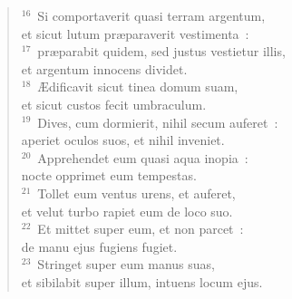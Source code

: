 \begin{flushleft}
\begin{verse}
${}^{16}$~Si comportaverit quasi terram argentum,\\ et sicut lutum pr\ae paraverit vestimenta~:\\
${}^{17}$~pr\ae parabit quidem, sed justus vestietur illis,\\ et argentum innocens dividet.\\
${}^{18}$~\AE dificavit sicut tinea domum suam,\\ et sicut custos fecit umbraculum.\\
${}^{19}$~Dives, cum dormierit, nihil secum auferet~:\\ aperiet oculos suos, et nihil inveniet.\\
${}^{20}$~Apprehendet eum quasi aqua inopia~:\\ nocte opprimet eum tempestas.\\
${}^{21}$~Tollet eum ventus urens, et auferet,\\ et velut turbo rapiet eum de loco suo.\\
${}^{22}$~Et mittet super eum, et non parcet~:\\ de manu ejus fugiens fugiet.\\
${}^{23}$~Stringet super eum manus suas,\\ et sibilabit super illum, intuens locum ejus.\end{verse}\end{flushleft}


